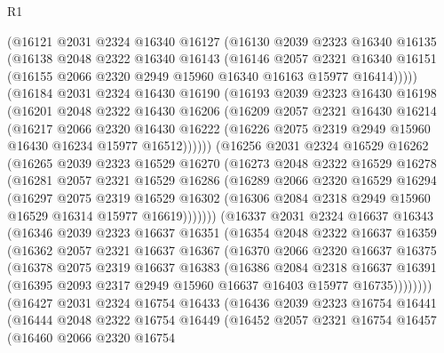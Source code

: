 \begin{lexlean}{R1}
\begin{coremodule}
    (@16121
      @2031
      @2324
      @16340
      @16127
      (@16130
        @2039
        @2323
        @16340
        @16135
        (@16138
          @2048
          @2322
          @16340
          @16143
          (@16146
            @2057
            @2321
            @16340
            @16151
            (@16155 @2066 @2320 @2949 @15960 @16340 @16163 @15977 @16414)))))
    (@16184
      @2031
      @2324
      @16430
      @16190
      (@16193
        @2039
        @2323
        @16430
        @16198
        (@16201
          @2048
          @2322
          @16430
          @16206
          (@16209
            @2057
            @2321
            @16430
            @16214
            (@16217
              @2066
              @2320
              @16430
              @16222
              (@16226 @2075 @2319 @2949 @15960 @16430 @16234 @15977 @16512))))))
    (@16256
      @2031
      @2324
      @16529
      @16262
      (@16265
        @2039
        @2323
        @16529
        @16270
        (@16273
          @2048
          @2322
          @16529
          @16278
          (@16281
            @2057
            @2321
            @16529
            @16286
            (@16289
              @2066
              @2320
              @16529
              @16294
              (@16297
                @2075
                @2319
                @16529
                @16302
                (@16306 @2084 @2318 @2949 @15960 @16529 @16314 @15977 @16619)))))))
    (@16337
      @2031
      @2324
      @16637
      @16343
      (@16346
        @2039
        @2323
        @16637
        @16351
        (@16354
          @2048
          @2322
          @16637
          @16359
          (@16362
            @2057
            @2321
            @16637
            @16367
            (@16370
              @2066
              @2320
              @16637
              @16375
              (@16378
                @2075
                @2319
                @16637
                @16383
                (@16386
                  @2084
                  @2318
                  @16637
                  @16391
                  (@16395 @2093 @2317 @2949 @15960 @16637 @16403 @15977 @16735))))))))
    (@16427
      @2031
      @2324
      @16754
      @16433
      (@16436
        @2039
        @2323
        @16754
        @16441
        (@16444
          @2048
          @2322
          @16754
          @16449
          (@16452
            @2057
            @2321
            @16754
            @16457
            (@16460
              @2066
              @2320
              @16754

\end{coremodule}
\end{lexlean}

